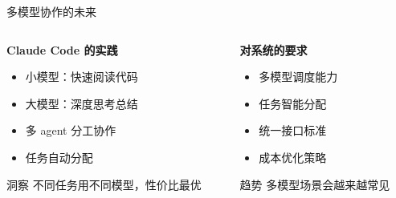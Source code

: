 \documentclass[aspectratio=169,xcolor=dvipsnames]{beamer}
\begin{document}
\begin{frame}{多模型协作的未来}
  \begin{columns}
    \begin{column}{0.48\textwidth}
      \textbf{Claude Code 的实践}
      \begin{itemize}
        \item 小模型：快速阅读代码
        \item 大模型：深度思考总结
        \item 多 agent 分工协作
        \item 任务自动分配
      \end{itemize}

      \vspace{0.3cm}

      \begin{alertblock}{洞察}
        不同任务用不同模型，性价比最优
      \end{alertblock}
    \end{column}
    \begin{column}{0.48\textwidth}
      \textbf{对系统的要求}
      \begin{itemize}
        \item 多模型调度能力
        \item 任务智能分配
        \item 统一接口标准
        \item 成本优化策略
      \end{itemize}

      \vspace{0.3cm}

      \begin{exampleblock}{趋势}
        多模型场景会越来越常见
      \end{exampleblock}
    \end{column}
  \end{columns}
\end{frame}
\end{document}
